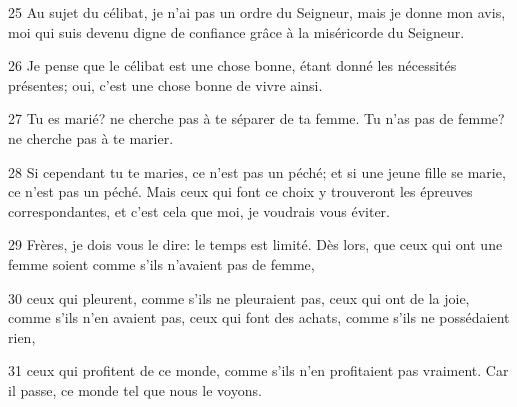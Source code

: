 25 Au sujet du célibat, je n’ai pas un ordre du Seigneur, mais je donne mon avis, moi qui suis devenu digne de confiance grâce à la miséricorde du Seigneur.

26 Je pense que le célibat est une chose bonne, étant donné les nécessités présentes; oui, c’est une chose bonne de vivre ainsi.

27 Tu es marié? ne cherche pas à te séparer de ta femme. Tu n’as pas de femme? ne cherche pas à te marier.

28 Si cependant tu te maries, ce n’est pas un péché; et si une jeune fille se marie, ce n’est pas un péché. Mais ceux qui font ce choix y trouveront les épreuves correspondantes, et c’est cela que moi, je voudrais vous éviter.

29 Frères, je dois vous le dire: le temps est limité. Dès lors, que ceux qui ont une femme soient comme s’ils n’avaient pas de femme,

30 ceux qui pleurent, comme s’ils ne pleuraient pas, ceux qui ont de la joie, comme s’ils n’en avaient pas, ceux qui font des achats, comme s’ils ne possédaient rien,

31 ceux qui profitent de ce monde, comme s’ils n’en profitaient pas vraiment. Car il passe, ce monde tel que nous le voyons.

